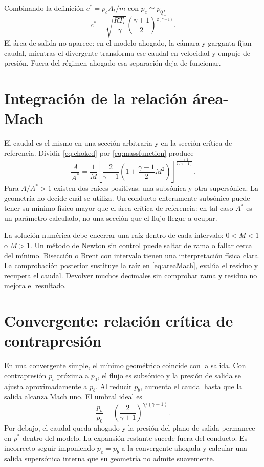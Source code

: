 Combinando la definición $c^*=p_cA_t/\dot m$ con $p_c\simeq p_0$,
\begin{equation}\label{eq:cstarideal}
 c^*=\sqrt{\frac{RT_c}{\gamma}}
 \left(\frac{\gamma+1}{2}\right)^{\frac{\gamma+1}{2(\gamma-1)}}.
\end{equation}
El área de salida no aparece: en el modelo ahogado, la cámara y garganta fijan caudal, mientras el divergente transforma ese caudal en velocidad y empuje de presión. Fuera del régimen ahogado esa separación deja de funcionar.
\section{Integración de la relación área-Mach}
El caudal es el mismo en una sección arbitraria y en la sección crítica de referencia. Dividir \eqref{eq:choked} por \eqref{eq:massfunction} produce
\begin{equation}\label{eq:areaMach}
 \boxed{\frac{A}{A^*}=\frac1M\left[\frac{2}{\gamma+1}
 \left(1+\frac{\gamma-1}{2}M^2\right)\right]^{\frac{\gamma+1}{2(\gamma-1)}}}.
\end{equation}
Para $A/A^*>1$ existen dos raíces positivas: una subsónica y otra supersónica. La geometría no decide cuál se utiliza. Un conducto enteramente subsónico puede tener su mínimo físico mayor que el área crítica de referencia: en tal caso $A^*$ es un parámetro calculado, no una sección que el flujo llegue a ocupar.

La solución numérica debe encerrar una raíz dentro de cada intervalo: $0<M<1$ o $M>1$. Un método de Newton sin control puede saltar de rama o fallar cerca del mínimo. Bisección o Brent con intervalo tienen una interpretación física clara. La comprobación posterior sustituye la raíz en \eqref{eq:areaMach}, evalúa el residuo y recupera el caudal. Devolver muchos decimales sin comprobar rama y residuo no mejora el resultado.
\section{Convergente: relación crítica de contrapresión}
En una convergente simple, el mínimo geométrico coincide con la salida. Con contrapresión $p_b$ próxima a $p_0$, el flujo es subsónico y la presión de salida se ajusta aproximadamente a $p_b$. Al reducir $p_b$, aumenta el caudal hasta que la salida alcanza Mach uno. El umbral ideal es
\[
 \frac{p_b}{p_0}=\left(\frac{2}{\gamma+1}\right)^{\gamma/(\gamma-1)}.
\]
Por debajo, el caudal queda ahogado y la presión del plano de salida permanece en $p^*$ dentro del modelo. La expansión restante sucede fuera del conducto. Es incorrecto seguir imponiendo $p_e=p_b$ a la convergente ahogada y calcular una salida supersónica interna que su geometría no admite suavemente.
